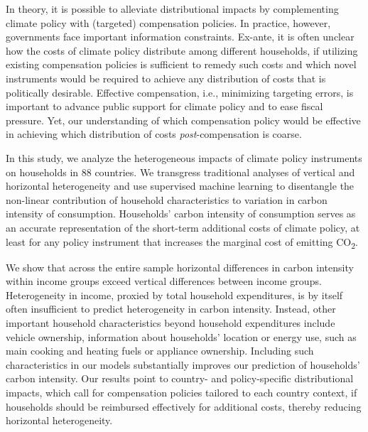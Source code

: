 \documentclass[12pt, a4paper]{article}
\begin{document}
In theory, it is possible to alleviate distributional impacts by complementing climate policy with (targeted) compensation policies. In practice, however, governments face important information constraints. Ex-ante, it is often unclear how the costs of climate policy distribute among different households, if utilizing existing compensation policies is sufficient to remedy such costs and which novel instruments would be required to achieve any distribution of costs that is politically desirable. Effective compensation, i.e., minimizing targeting errors, is important to advance public support for climate policy and to ease fiscal pressure. Yet, our understanding of which compensation policy would be effective in achieving which distribution of costs \textit{post}-compensation is coarse.

In this study, we analyze the heterogeneous impacts of climate policy instruments on households in 88 countries. We transgress traditional analyses of vertical and horizontal heterogeneity and use supervised machine learning to disentangle the non-linear contribution of household characteristics to variation in carbon intensity of consumption. Households' carbon intensity of consumption serves as an accurate representation of the short-term additional costs of climate policy, at least for any policy instrument that increases the marginal cost of emitting CO\textsubscript{2}.

We show that across the entire sample horizontal differences in carbon intensity within income groups exceed vertical differences between income groups. Heterogeneity in income, proxied by total household expenditures, is by itself often insufficient to predict heterogeneity in carbon intensity. Instead, other important household characteristics beyond household expenditures include vehicle ownership, information about households' location or energy use, such as main cooking and heating fuels or appliance ownership. Including such characteristics in our models substantially improves our prediction of households' carbon intensity. Our results point to country- and policy-specific distributional impacts, which call for compensation policies tailored to each country context, if households should be reimbursed effectively for additional costs, thereby reducing horizontal heterogeneity. 
\end{document}

